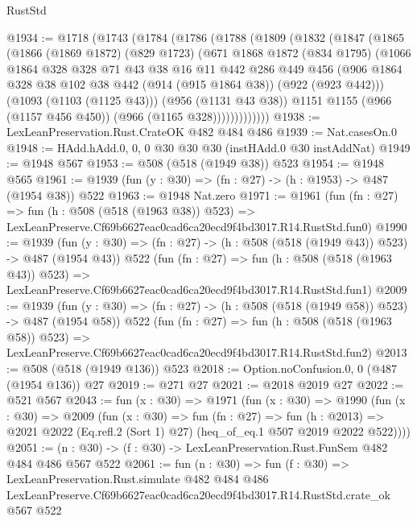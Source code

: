 \begin{lexlean}{RustStd}
\begin{coremodule}
@1934 := @1718
    (@1743
      (@1784
        (@1786
          (@1788
            (@1809
              (@1832
                (@1847
                  (@1865
                    (@1866
                      (@1869 @1872)
                      (@829 @1723)
                      (@671
                        @1868
                        @1872
                        (@834 @1795)
                        (@1066
                          @1864
                          @328
                          @328
                          @71
                          @43
                          @38
                          @16
                          @11
                          @442
                          @286
                          @449
                          @456
                          (@906
                            @1864
                            @328
                            @38
                            @102
                            @38
                            @442
                            (@914 (@915 @1864 @38))
                            (@922 (@923 @442)))
                          (@1093 (@1103 (@1125 @43)))
                          (@956 (@1131 @43 @38))
                          @1151
                          @1155
                          (@966 (@1157 @456 @450))
                          (@966 (@1165 @328)))))))))))))
@1938 := LexLeanPreservation.Rust.CrateOK @482 @484 @486
@1939 := Nat.casesOn.{0}
@1948 := HAdd.hAdd.{0, 0, 0} @30 @30 @30 (instHAdd.{0} @30 instAddNat)
@1949 := @1948 @567
@1953 := @508 (@518 (@1949 @38)) @523
@1954 := @1948 @565
@1961 := @1939 (fun (y : @30) => (fn : @27) -> (h : @1953) -> @487 (@1954 @38)) @522
@1963 := @1948 Nat.zero
@1971 := @1961
    (fun (fn : @27) =>
    fun (h : @508 (@518 (@1963 @38)) @523) =>
    LexLeanPreserve.Cf69b6627eac0cad6ca20ecd9f4bd3017.R14.RustStd.fun0)
@1990 := @1939
    (fun (y : @30) => (fn : @27) -> (h : @508 (@518 (@1949 @43)) @523) -> @487 (@1954 @43))
    @522
    (fun (fn : @27) =>
    fun (h : @508 (@518 (@1963 @43)) @523) =>
    LexLeanPreserve.Cf69b6627eac0cad6ca20ecd9f4bd3017.R14.RustStd.fun1)
@2009 := @1939
    (fun (y : @30) => (fn : @27) -> (h : @508 (@518 (@1949 @58)) @523) -> @487 (@1954 @58))
    @522
    (fun (fn : @27) =>
    fun (h : @508 (@518 (@1963 @58)) @523) =>
    LexLeanPreserve.Cf69b6627eac0cad6ca20ecd9f4bd3017.R14.RustStd.fun2)
@2013 := @508 (@518 (@1949 @136)) @523
@2018 := Option.noConfusion.{0, 0} (@487 (@1954 @136)) @27
@2019 := @271 @27
@2021 := @2018 @2019 @27
@2022 := @521 @567
@2043 := fun (x : @30) =>
  @1971
    (fun (x : @30) =>
    @1990
      (fun (x : @30) =>
      @2009
        (fun (x : @30) =>
        fun (fn : @27) =>
        fun (h : @2013) =>
        @2021 @2022 (Eq.refl.{2} (Sort 1) @27) (heq_of_eq.{1} @507 @2019 @2022 @522))))
@2051 := (n : @30) -> (f : @30) -> LexLeanPreservation.Rust.FunSem @482 @484 @486 @567 @522
@2061 := fun (n : @30) =>
  fun (f : @30) =>
  LexLeanPreservation.Rust.simulate
    @482
    @484
    @486
    LexLeanPreserve.Cf69b6627eac0cad6ca20ecd9f4bd3017.R14.RustStd.crate_ok
    @567
    @522
\end{coremodule}
\end{lexlean}
